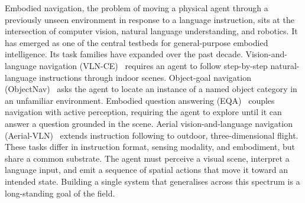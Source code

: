 \documentclass[conference]{IEEEtran}
\begin{document}
Embodied navigation, the problem of moving a physical
agent through a previously unseen environment in response to a
language instruction, sits at the intersection of computer vision,
natural language understanding, and robotics.  It has emerged as
one of the central testbeds for general-purpose embodied
intelligence.
Its task families have expanded over the past decade. Vision-and-language
navigation (VLN-CE)~\cite{anderson2018vision,krantz2020beyond,ku2020rxr}
requires an agent to follow step-by-step natural-language instructions through
indoor scenes. Object-goal navigation
(ObjectNav)~\cite{batra2020objectnav,ramakrishnan2021hm3d,yokoyama2024hm3dovon}
asks the agent to locate an instance of a named object category in an
unfamiliar environment. Embodied question answering
(EQA)~\cite{das2018eqa,majumdar2024openeqa} couples navigation with active
perception, requiring the agent to explore until it can answer a question
grounded in the scene. Aerial vision-and-language navigation
(Aerial-VLN)~\cite{wang2024openuav} extends instruction following to outdoor,
three-dimensional flight.  These tasks differ in instruction format, sensing
modality, and embodiment, but share a common substrate.  The agent must
perceive a visual scene, interpret a language input, and emit a sequence of
spatial actions that move it toward an intended state.  {Building a single
system that generalises across this spectrum is a long-standing goal of the
field.}%
\end{document}
